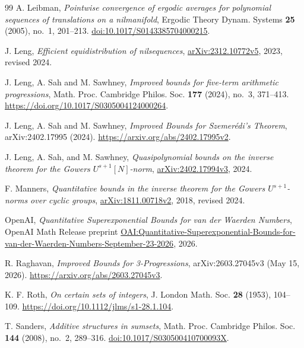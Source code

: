 \begin{thebibliography}{99}
A. Leibman, \emph{Pointwise convergence of ergodic averages for polynomial
sequences of translations on a nilmanifold},
Ergodic Theory Dynam. Systems \textbf{25} (2005), no.~1, 201--213.
\href{https://doi.org/10.1017/S0143385704000215}{doi:10.1017/S0143385704000215}.

J. Leng, \emph{Efficient equidistribution of nilsequences},
\href{https://arxiv.org/abs/2312.10772v5}{arXiv:2312.10772v5}, 2023, revised 2024.

J. Leng, A. Sah and M. Sawhney, \emph{Improved bounds for five-term arithmetic
progressions}, Math. Proc. Cambridge Philos. Soc. \textbf{177} (2024),
no.~3, 371--413. \url{https://doi.org/10.1017/S0305004124000264}.

J. Leng, A. Sah and M. Sawhney, \emph{Improved Bounds for Szemer\'edi's
Theorem}, arXiv:2402.17995 (2024).
\url{https://arxiv.org/abs/2402.17995v2}.

J. Leng, A. Sah, and M. Sawhney,
\emph{Quasipolynomial bounds on the inverse theorem for the Gowers $U^{s+1}[N]$-norm},
\href{https://arxiv.org/abs/2402.17994v3}{arXiv:2402.17994v3}, 2024.

F. Manners, \emph{Quantitative bounds in the inverse theorem for the Gowers
$U^{s+1}$-norms over cyclic groups},
\href{https://arxiv.org/abs/1811.00718v2}{arXiv:1811.00718v2},
2018, revised 2024.

OpenAI, \emph{Quantitative Superexponential Bounds for van der Waerden Numbers},
OpenAI Math Release preprint
\href{https://github.com/openai/math/blob/main/preprints/Quantitative-Superexponential-Bounds-for-van-der-Waerden-Numbers-September-23-2026/paper.pdf}{OAI:Quantitative-Superexponential-Bounds-for-van-der-Waerden-Numbers-September-23-2026},
2026.

R. Raghavan, \emph{Improved Bounds for 3-Progressions},
arXiv:2603.27045v3 (May 15, 2026).
\url{https://arxiv.org/abs/2603.27045v3}.

K. F. Roth, \emph{On certain sets of integers},
J. London Math. Soc. \textbf{28} (1953), 104--109.
\url{https://doi.org/10.1112/jlms/s1-28.1.104}.

T. Sanders, \emph{Additive structures in sumsets},
Math. Proc. Cambridge Philos. Soc. \textbf{144} (2008), no.~2, 289--316.
\href{https://doi.org/10.1017/S030500410700093X}{doi:10.1017/S030500410700093X}.


\end{thebibliography}
